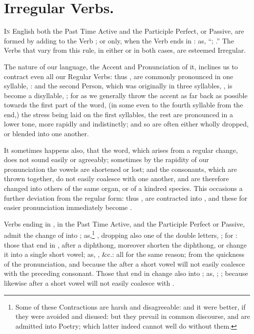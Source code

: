 \chapter{Irregular Verbs.}

\textsc{In} English both the Past Time Active and the Participle
Perfect, or Passive, are formed by adding to the Verb ; or 
only, when the Verb ends in : as, ``; .'' The Verbs that vary from this rule, in either or in both
cases, are esteemed Irregular.

The nature of our language, the Accent and Pronunciation of it, inclines
us to contract even all our Regular Verbs: thus , are
commonly pronounced in one syllable, : and the second
Person, which was originally in three syllables, , is become a disyllable, ; for as we
generally throw the accent as far back as possible towards the first
part of the word, (in some even to the fourth syllable from the end,)
the stress being laid on the first syllables, the rest are pronounced in
a lower tone, more rapidly and indistinctly; and so are often either
wholly dropped, or blended into one another.

It sometimes happens also, that the word, which arises from a regular
change, does not sound easily or agreeably; sometimes by the rapidity of
our pronunciation the vowels are shortened or lost; and the consonants,
which are thrown together, do not easily coalesce with one another, and
are therefore changed into others of the same organ, or of a kindred
species. This occasions a further deviation from the regular form: thus
, are contracted into , and
these for easier pronunciation immediately become .

Verbs ending in , in the Past Time Active, and
the Participle Perfect or Passive, admit the change of  into
; as,\footnote{Some of these Contractions are harsh and
  disagreeable: and it were better, if they were avoided and disused:
  but they prevail in common discourse, and are admitted into Poetry;
  which latter indeed cannot well do without them.} , dropping also one of the double letters, ;
for : those that
end in , after a diphthong, moreover shorten the
diphthong, or change it into a single short vowel; as, , \&c.: all for the same reason; from the
quickness of the pronunciation, and because the  after a short
vowel will not easily coalesce with the preceding consonant. Those that
end in  change also  into ; as, ;
; because likewise  after a short vowel will not
easily coalesce with .

